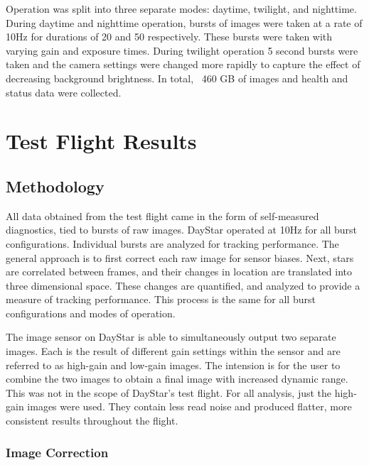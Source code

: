 \documentclass[twocolumn,letterpaper]{IEEEAerospace2012}
\begin{document}
Operation was split into three separate modes: daytime, twilight, and nighttime. During daytime and nighttime operation, bursts of images were taken at a rate of 10Hz for durations of 20 and 50 respectively. These bursts were taken with varying gain and exposure times. During twilight operation 5 second bursts were taken and the camera settings were changed more rapidly to capture the effect of decreasing background brightness. In total, ~460 GB of images and health and status data were collected.

\section{Test Flight Results}

\subsection{Methodology}

All data obtained from the test flight came in the form of self-measured diagnostics, tied to bursts of raw images. DayStar operated at 10Hz for all burst configurations. Individual bursts are analyzed for tracking performance. The general approach is to first correct each raw image for sensor biases. Next, stars are correlated between frames, and their changes in location are translated into three dimensional space. These changes are quantified, and analyzed to provide a measure of tracking performance. This process is the same for all burst configurations and modes of operation.  

The image sensor on DayStar is able to simultaneously output two separate images. Each is the result of different gain settings within the sensor and are referred to as high-gain and low-gain images. The intension is for the user to combine the two images to obtain a final image with increased dynamic range. This was not in the scope of DayStar's test flight. For all analysis, just the high-gain images were used. They contain less read noise and produced flatter, more consistent results throughout the flight. 


\subsubsection{Image Correction}
\end{document}
